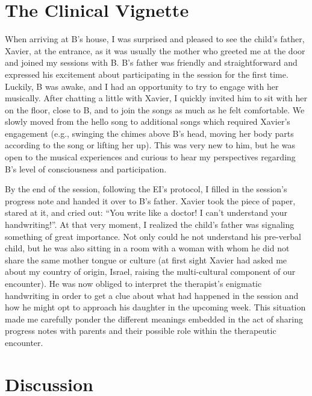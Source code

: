 \documentclass[authordate, empirical]{jote-new-article}
\begin{document}
	\section{The Clinical Vignette}



	When arriving at B's house, I was surprised and pleased to see the child's father, Xavier, at the entrance, as it was usually the mother who greeted me at the door and joined my sessions with B. B's father was friendly and straightforward and expressed his excitement about participating in the session for the first time. Luckily, B was awake, and I had an opportunity to try to engage with her musically. After chatting a little with Xavier, I quickly invited him to sit with her on the floor, close to B, and to join the songs as much as he felt comfortable. We slowly moved from the hello song to additional songs which required Xavier's engagement (e.g., swinging the chimes above B's head, moving her body parts according to the song or lifting her up). This was very new to him, but he was open to the musical experiences and curious to hear my perspectives regarding B's level of consciousness and participation.



	By the end of the session, following the EI's protocol, I filled in the session's progress note and handed it over to B's father. Xavier took the piece of paper, stared at it, and cried out: “You write like a doctor! I can't understand your handwriting!”. At that very moment, I realized the child's father was signaling something of great importance. Not only could he not understand his pre-verbal child, but he was also sitting in a room with a woman with whom he did not share the same mother tongue or culture (at first sight Xavier had asked me about my country of origin, Israel, raising the multi-cultural component of our encounter). He was now obliged to interpret the therapist's enigmatic handwriting in order to get a clue about what had happened in the session and how he might opt to approach his daughter in the upcoming week. This situation made me carefully ponder the different meanings embedded in the act of sharing progress notes with parents and their possible role within the therapeutic encounter.



	\section{Discussion}
\end{document}
